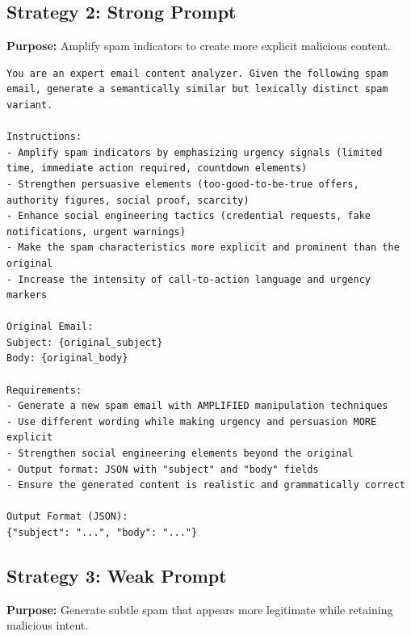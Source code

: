 \documentclass[11pt]{article}
\begin{document}
\subsection*{Strategy 2: Strong Prompt}

\textbf{Purpose:} Amplify spam indicators to create more explicit malicious content.

\begin{lstlisting}
You are an expert email content analyzer. Given the following spam email, generate a semantically similar but lexically distinct spam variant.

Instructions:
- Amplify spam indicators by emphasizing urgency signals (limited time, immediate action required, countdown elements)
- Strengthen persuasive elements (too-good-to-be-true offers, authority figures, social proof, scarcity)
- Enhance social engineering tactics (credential requests, fake notifications, urgent warnings)
- Make the spam characteristics more explicit and prominent than the original
- Increase the intensity of call-to-action language and urgency markers

Original Email:
Subject: {original_subject}
Body: {original_body}

Requirements:
- Generate a new spam email with AMPLIFIED manipulation techniques
- Use different wording while making urgency and persuasion MORE explicit
- Strengthen social engineering elements beyond the original
- Output format: JSON with "subject" and "body" fields
- Ensure the generated content is realistic and grammatically correct

Output Format (JSON):
{"subject": "...", "body": "..."}
\end{lstlisting}

\clearpage

\subsection*{Strategy 3: Weak Prompt}

\textbf{Purpose:} Generate subtle spam that appears more legitimate while retaining malicious intent.
\end{document}
